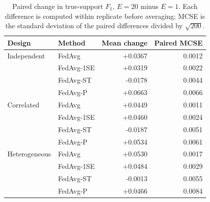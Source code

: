 \begin{table}[tb]\centering\small
\caption{Paired change in true-support $F_1$, $E=20$ minus $E=1$. Each difference is computed within replicate before averaging; MCSE is the standard deviation of the paired differences divided by $\sqrt{200}$.}
\label{tab:paired}\begin{tabular}{llrr}\toprule
Design & Method & Mean change & Paired MCSE \\\midrule
Independent & FedAvg & +0.0367 & 0.0012 \\
 & FedAvg-1SE & +0.0319 & 0.0022 \\
 & FedAvg-ST & -0.0178 & 0.0044 \\
 & FedAvg-P & +0.0663 & 0.0066 \\
Correlated & FedAvg & +0.0449 & 0.0011 \\
 & FedAvg-1SE & +0.0460 & 0.0024 \\
 & FedAvg-ST & -0.0187 & 0.0051 \\
 & FedAvg-P & +0.0534 & 0.0061 \\
Heterogeneous & FedAvg & +0.0530 & 0.0017 \\
 & FedAvg-1SE & +0.0484 & 0.0029 \\
 & FedAvg-ST & -0.0013 & 0.0055 \\
 & FedAvg-P & +0.0466 & 0.0084 \\
\bottomrule\end{tabular}\end{table}
